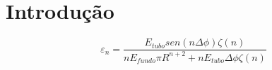 \documentclass[a4paper,12pt]{article}
\begin{document}
\title{}

\author{Aluno: Rafael M. Miller NUSP.: 7581818}

\maketitle

\section{Introdução}

\begin{equation}
\varepsilon_n = \frac{E_{tubo} sen(n \Delta \phi) \zeta(n)}{n E_{fundo} \pi R^{n+2} + n  E_{tubo} \Delta \phi \zeta(n)}
\label{eq:analitical_epsilon_n}
\end{equation}
\end{document}
